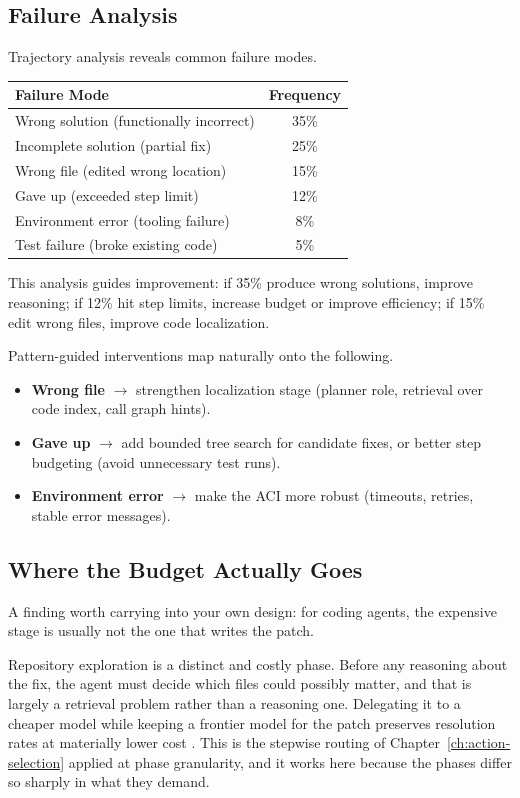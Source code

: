 \subsection{Failure Analysis}

Trajectory analysis reveals common failure modes.

\begin{center}
\begin{tabular}{lc}
\toprule
Failure Mode & Frequency \\
\midrule
Wrong solution (functionally incorrect) & 35\% \\
Incomplete solution (partial fix) & 25\% \\
Wrong file (edited wrong location) & 15\% \\
Gave up (exceeded step limit) & 12\% \\
Environment error (tooling failure) & 8\% \\
Test failure (broke existing code) & 5\% \\
\bottomrule
\end{tabular}
\end{center}

This analysis guides improvement: if 35\% produce wrong solutions, improve reasoning; if 12\% hit step limits, increase budget or improve efficiency; if 15\% edit wrong files, improve code localization.

Pattern-guided interventions map naturally onto the following.
\begin{itemize}
\item \textbf{Wrong file} $\rightarrow$ strengthen localization stage (planner role, retrieval over code index, call graph hints).
\item \textbf{Gave up} $\rightarrow$ add bounded tree search for candidate fixes, or better step budgeting (avoid unnecessary test runs).
\item \textbf{Environment error} $\rightarrow$ make the ACI more robust (timeouts, retries, stable error messages).
\end{itemize}

\subsection{Where the Budget Actually Goes}

A finding worth carrying into your own design: for coding agents, the expensive
stage is usually not the one that writes the patch.

Repository exploration is a distinct and costly phase. Before any reasoning about the fix, the agent must decide which files could possibly matter, and that is largely a retrieval problem rather than a reasoning one. Delegating it to a cheaper model
while keeping a frontier model for the patch preserves resolution rates at
materially lower cost \cite{repoexplore2026}. This is the stepwise routing of
Chapter~\ref{ch:action-selection} applied at phase granularity, and it works here
because the phases differ so sharply in what they demand.

